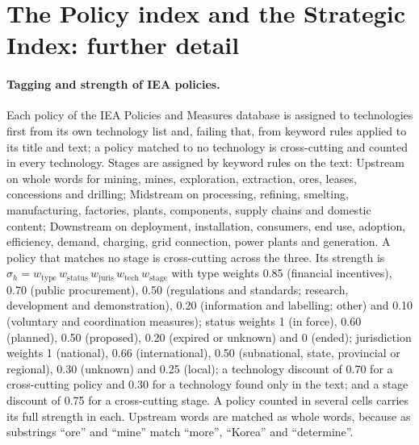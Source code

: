 \section{The Policy index and the Strategic Index: further detail}\label{oa:strategic}

\paragraph{Tagging and strength of IEA policies.} Each policy of the IEA Policies and Measures
database \citep{iea2026pams} is assigned to technologies first from its own technology list and,
failing that, from keyword rules applied to its title and text; a policy matched to no technology
is cross-cutting and counted in every technology. Stages are assigned by keyword rules on the text:
Upstream on whole words for mining, mines, exploration, extraction, ores, leases, concessions and
drilling; Midstream on processing, refining, smelting, manufacturing, factories, plants, components,
supply chains and domestic content; Downstream on deployment, installation, consumers, end use,
adoption, efficiency, demand, charging, grid connection, power plants and generation. A policy that
matches no stage is cross-cutting across the three. Its strength is
$\sigma_h=w_{\mathrm{type}}\,w_{\mathrm{status}}\,w_{\mathrm{juris}}\,w_{\mathrm{tech}}\,w_{\mathrm{stage}}$
with type weights 0.85 (financial incentives), 0.70 (public procurement), 0.50 (regulations and
standards; research, development and demonstration), 0.20 (information and labelling; other) and
0.10 (voluntary and coordination measures); status weights 1 (in force), 0.60 (planned), 0.50
(proposed), 0.20 (expired or unknown) and 0 (ended); jurisdiction weights 1 (national), 0.66
(international), 0.50 (subnational, state, provincial or regional), 0.30 (unknown) and 0.25 (local);
a technology discount of 0.70 for a cross-cutting policy and 0.30 for a technology found only in the
text; and a stage discount of 0.75 for a cross-cutting stage. A policy counted in several cells
carries its full strength in each. Upstream words are matched as whole words, because as substrings
``ore'' and ``mine'' match ``more'', ``Korea'' and ``determine''.

